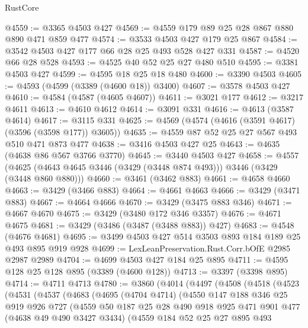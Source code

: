 \begin{lexlean}{RustCore}
\begin{coremodule}
@4559 := @3365 @4503 @427
@4569 := @4559 @179 @89 @25 @28 @867 @880 @890 @471 @859 @477
@4574 := @3533 @4503 @427 @179 @25 @867
@4584 := @3542 @4503 @427 @177 @66 @28 @25 @493 @528 @427 @331
@4587 := @4520 @66 @28 @528
@4593 := @4525 @40 @52 @25 @27 @480 @510
@4595 := @3381 @4503 @427
@4599 := @4595 @18 @25 @18 @480
@4600 := @3390 @4503
@4605 := @4593 (@4599 (@3389 (@4600 @18)) @3400)
@4607 := @3578 @4503 @427
@4610 := @4584 (@4587 (@4605 @4607))
@4611 := @3021 @177
@4612 := @3217 @4611
@4613 := @4610 @4612
@4614 := @3091 @331
@4616 := @4613 (@3587 @4614)
@4617 := @3115 @331
@4625 := @4569 (@4574 (@4616 (@3591 @4617) (@3596 (@3598 @177)) @3605))
@4635 := @4559 @87 @52 @25 @27 @567 @493 @510 @471 @873 @477
@4638 := @3416 @4503 @427 @25
@4643 := @4635 (@4638 @86 @567 @3766 @3770)
@4645 := @3440 @4503 @427
@4658 := @4557 (@4625 (@4643 @4645 @3446 (@3429 (@3448 @874 @493))) @3446 (@3429 (@3448 @860 @880)))
@4660 := @3461 (@3462 @883)
@4661 := @4658 @4660
@4663 := @3429 (@3466 @883)
@4664 := @4661 @4663
@4666 := @3429 (@3471 @883)
@4667 := @4664 @4666
@4670 := @3429 (@3475 @883 @346)
@4671 := @4667 @4670
@4675 := @3429 (@3480 @172 @346 @3357)
@4676 := @4671 @4675
@4681 := @3429 (@3486 (@3487 (@3488 @883)) @427)
@4683 := @4548 (@4676 @4681)
@4695 := @3499 @4503 @427 @514 @3503 @893 @184 @189 @25 @493 @895 @919 @928
@4699 := LexLeanPreservation.Rust.Corr.bOfE @2985 @2987 @2989
@4704 := @4699 @4503 @427 @184 @25 @895
@4711 := @4595 @128 @25 @128 @895 (@3389 (@4600 @128))
@4713 := @3397 (@3398 @895)
@4714 := @4711 @4713
@4780 := @3860
    (@4014
      (@4497
        (@4508
          (@4518
            (@4523
              (@4531
                (@4537
                  (@4683
                    (@4695
                      (@4704 @4714)
                      (@4550
                        @147
                        @188
                        @346
                        @25
                        @919
                        @926
                        @727
                        (@4559
                          @50
                          @187
                          @25
                          @28
                          @490
                          @918
                          @925
                          @471
                          @901
                          @477
                          (@4638 @49 @490 @3427 @3434)
                          (@4559
                            @184
                            @52
                            @25
                            @27
                            @895
                            @493

\end{coremodule}
\end{lexlean}

